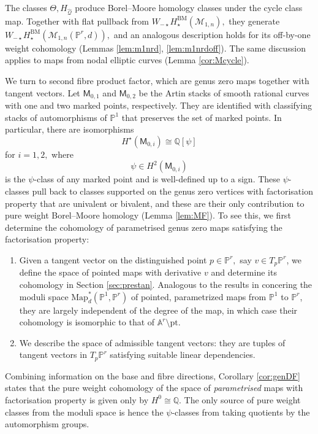 \documentclass[12pt,reqno]{amsart}
\theoremstyle{definition}
\theoremstyle{definition}
\theoremstyle{definition}
\theoremstyle{definition}
\newcommand{\PP}{\mathbb{P}}
\begin{document}
The classes $\Theta, H_{\hat{\mathcal{Q}}}$ produce Borel--Moore homology classes under the cycle class map. Together with flat pullback from $W_{-\star} H_\star^{\mathrm{BM}}(\mathcal{M}_{1,n}),$ they generate $W_{-\star} H_\star^{\mathrm{BM}}(\mathcal{M}_{1,n}(\PP^r,d)),$ and an analogous description holds for its off-by-one weight cohomology (Lemmas \ref{lem:m1nrd}, \ref{lem:m1nrdoff}). The same discussion applies to maps from nodal elliptic curves (Lemma \ref{cor:Mcycle}).

We turn to second fibre product factor, which are genus zero maps together with tangent vectors. Let $\mathsf{M}_{0,1}$ and $\mathsf{M}_{0,2}$ be the Artin stacks of smooth rational curves with one and two marked points, respectively. They are identified with classifying stacks of automorphisms of $\mathbb{P}^1$ that preserves the set of marked points. In particular, there are isomorphisms $$H^\star(\mathsf{M}_{0,i})\cong \mathbb{Q}[\psi]$$ for $i=1,2,$ where $$\psi\in H^2(\mathsf{M}_{0,i})$$ is the $\psi$-class of any marked point and is well-defined up to a sign. These $\psi$-classes pull back to classes supported on the genus zero vertices with factorisation property that are univalent or bivalent, and these are their only contribution to pure weight Borel--Moore homology (Lemma \ref{lem:MF}). To see this, we first determine the cohomology of parametrised genus zero maps satisfying the factorisation property: \begin{enumerate}
  \item Given a tangent vector on the distinguished point $p\in \mathbb{P}^r,$ say $v\in T_p \mathbb{P}^r$, we define the space of pointed maps with derivative $v$ and determine its cohomology in Section \ref{sec:prestan}. Analogous to the results in \cite{farbwolf} concering the moduli space $\mathrm{Map}^*_d(\mathbb{P}^1, \mathbb{P}^r)$ of pointed, parametrized maps from $\PP^1$ to $\PP^r$, they are largely independent of the degree of the map, in which case their cohomology is isomorphic to that of $\mathbb{A}^r\setminus \mathrm{pt}.$
  \item We describe the space of admissible tangent vectors: they are tuples of tangent vectors in $T_p \mathbb{P}^r$ satisfying suitable linear dependencies.
\end{enumerate}

Combining information on the base and fibre directions, Corollary \ref{cor:genDF} states that the pure weight cohomology of the space of \emph{parametrised} maps with factorisation property is given only by $H^0\cong \mathbb{Q}.$ The only source of pure weight classes from the moduli space is hence the $\psi$-classes from taking quotients by the automorphism groups.
\end{document}
